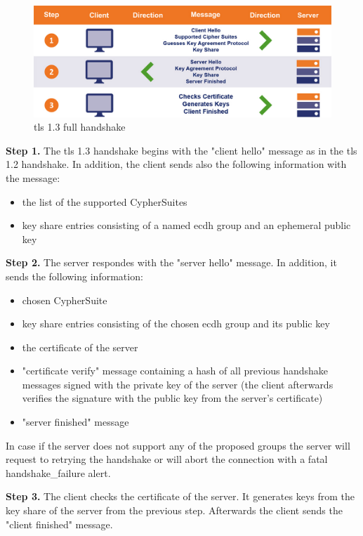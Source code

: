 \begin{figure}[H]
	\centering
		\includegraphics[scale=0.35]{images/handshake1_3.jpg}
	\caption{\gls{tls} 1.3 full handshake \cite{sslstore:handshake}}
	\label{fig:handshake1_3}
\end{figure}

\textbf{Step 1.} The \gls{tls} 1.3 handshake begins with the "client hello" message as in the \gls{tls} 1.2 handshake. In addition, the client sends also the following information with the message:

\begin{itemize}
	\item the list of the supported CypherSuites
	\item key share entries consisting of a named \gls{ecdh} group and an ephemeral public key
\end{itemize}

\textbf{Step 2.} The server respondes with the "server hello" message. In addition, it sends the following information:

\begin{itemize}
	\item chosen CypherSuite
	\item key share entries consisting of the chosen \gls{ecdh} group and its public key
	\item the certificate of the server
	\item "certificate verify" message containing a hash of all previous handshake messages signed with the private key of the server (the client afterwards verifies the signature with the public key from the server's certificate)
	\item "server finished" message
\end{itemize}

In case if the server does not support any of the proposed groups the server will request to retrying the handshake or will abort the connection with a fatal handshake\_failure alert.

\textbf{Step 3.} The client checks the certificate of the server. It generates keys from the key share of the server from the previous step. Afterwards the client sends the "client finished" message. \cite{Hassenstein}\cite{sslstore:handshake}

